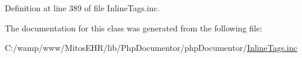 \-Definition at line 389 of file \-Inline\-Tags.\-inc.



\-The documentation for this class was generated from the following file\-:\begin{DoxyCompactItemize}
\item 
\-C\-:/wamp/www/\-Mitos\-E\-H\-R/lib/\-Php\-Documentor/php\-Documentor/\hyperlink{_inline_tags_8inc}{\-Inline\-Tags.\-inc}\end{DoxyCompactItemize}
